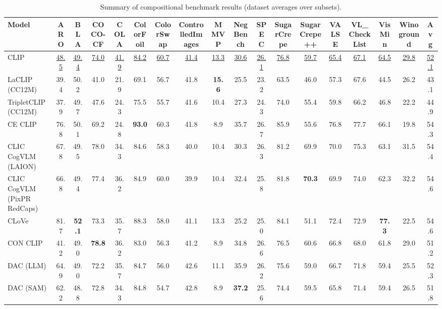 \begin{table}[t]
  \centering
  \scriptsize
  \caption{Summary of compositional benchmark results (dataset averages over subsets).}
  \label{tab:summary_compositional}
  \begin{adjustbox}{max width=\textwidth}
  \setlength{\tabcolsep}{2pt}
  \begin{tabular}{lccccccccccccccccc}
    \toprule
    Model & ARO & BLA & COCO-CF & COLA & ColorFoil & ColorSwap & ControlledImages & MMVP & NegBench & SPEC & SugarCrepe & SugarCrepe++ & VALSE & VL\_CheckList & VisMin & Winoground & Avg \\
    \midrule
    CLIP & \underline{48.5} & \underline{49.4} & \underline{74.0} & \underline{41.9} & \underline{84.2} & \underline{60.7} & \underline{41.4} & \underline{13.3} & \underline{30.6} & \underline{26.1} & \underline{76.8} & \underline{59.7} & \underline{65.4} & \underline{67.1} & \underline{64.5} & \underline{29.8} & \underline{52.1} \\
    \midrule
    LaCLIP (CC12M) & 39.4 & 50.2 & 41.0 & 21.9 & 69.1 & 56.7 & 41.8 & \textbf{15.6} & 25.5 & 23.2 & 63.5 & 46.0 & 57.3 & 67.6 & 44.5 & 26.2 & 43.1 \\
    TripletCLIP (CC12M) & 37.9 & 49.7 & 47.6 & 24.3 & 75.5 & 55.7 & 41.6 & 10.4 & 27.3 & 24.3 & 74.0 & 55.4 & 59.8 & 66.2 & 46.8 & 22.2 & 44.9 \\
    \midrule
    CE CLIP & 76.8 & 50.1 & 69.2 & 24.8 & \textbf{93.0} & 60.3 & 41.8 & 8.9 & 35.7 & 26.7 & 85.9 & 55.6 & 76.8 & 77.7 & 66.1 & 19.8 & 54.3 \\
    CLIC CogVLM (LAION) & 67.8 & 49.5 & 78.0 & 34.3 & 84.6 & 58.3 & 40.0 & 10.4 & 30.3 & 26.3 & 81.2 & 69.9 & 70.0 & 75.3 & 63.1 & 31.5 & 54.4 \\
    CLIC CogVLM (PixPR RedCaps) & 66.8 & 49.4 & 77.4 & 36.2 & 84.9 & 60.0 & 39.9 & 10.4 & 32.4 & 25.8 & 81.8 & \textbf{70.3} & 69.9 & 74.0 & 62.3 & 32.2 & 54.6 \\
    CLoVe & 81.7 & \textbf{52.1} & 73.3 & 35.7 & 88.3 & 58.0 & 41.1 & 13.3 & 25.2 & 25.0 & 84.1 & 51.1 & 72.4 & 72.9 & \textbf{77.3} & 22.5 & 54.6 \\
    CON CLIP & 41.2 & 49.0 & \textbf{78.8} & 36.2 & 83.0 & 56.3 & 41.2 & 8.9 & 34.8 & 26.6 & 76.5 & 60.6 & 66.8 & 68.0 & 61.8 & 29.0 & 51.2 \\
    DAC (LLM) & 64.9 & 49.0 & 72.2 & 35.7 & 84.7 & 56.0 & 42.6 & 11.1 & 35.9 & 26.2 & 75.6 & 59.0 & 66.7 & 71.8 & 59.4 & 25.5 & 52.3 \\
    DAC (SAM) & 62.2 & 48.8 & 72.8 & 34.3 & 84.8 & 54.7 & 42.8 & 8.9 & \textbf{37.2} & 25.6 & 74.4 & 59.5 & 65.8 & 71.4 & 59.4 & 26.5 & 51.8 \\

\end{tabular}
\end{adjustbox}
\end{table}
